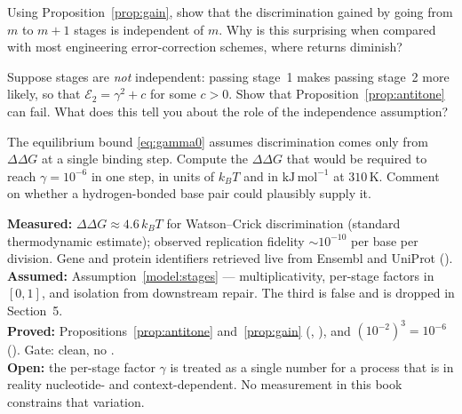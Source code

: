 \begin{exercise}
Using Proposition~\ref{prop:gain}, show that the discrimination gained by going
from $m$ to $m+1$ stages is independent of $m$. Why is this surprising when
compared with most engineering error-correction schemes, where returns diminish?
\end{exercise}

\begin{exercise}
Suppose stages are \emph{not} independent: passing stage~1 makes passing stage~2
more likely, so that $\mathcal{E}_2 = \gamma^2 + c$ for some $c > 0$. Show that
Proposition~\ref{prop:antitone} can fail. What does this tell you about the role
of the independence assumption?
\end{exercise}

\begin{exercise}
The equilibrium bound \eqref{eq:gamma0} assumes discrimination comes only from
$\Delta\Delta G$ at a single binding step. Compute the $\Delta\Delta G$ that would
be required to reach $\gamma = 10^{-6}$ in one step, in units of $k_BT$ and in
$\mathrm{kJ\,mol^{-1}}$ at $310$\,K. Comment on whether a hydrogen-bonded base pair
could plausibly supply it.
\end{exercise}

\begin{ledger}
\textbf{Measured:} $\Delta\Delta G \approx 4.6\,k_BT$ for Watson--Crick
discrimination (standard thermodynamic estimate); observed replication fidelity
$\sim10^{-10}$ per base per division. Gene and protein identifiers retrieved live
from Ensembl and UniProt (). \\
\textbf{Assumed:} Assumption~\ref{model:stages} --- multiplicativity, per-stage
factors in $[0,1]$, and isolation from downstream repair. The third is false and
is dropped in Section~5. \\
\textbf{Proved:} Propositions~\ref{prop:antitone} and~\ref{prop:gain}
(, ), and
$\left(10^{-2}\right)^3 = 10^{-6}$ (). Gate:
clean, no . \\
\textbf{Open:} the per-stage factor $\gamma$ is treated as a single number for a
process that is in reality nucleotide- and context-dependent. No measurement in
this book constrains that variation.
\end{ledger}
